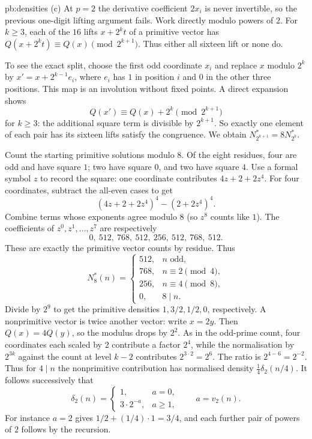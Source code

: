 \begin{solution}{pb:densities}
(c) At $p=2$ the derivative coefficient $2x_i$ is never invertible, so the previous one-digit lifting argument fails. Work directly modulo powers of $2$. For $k\ge3$, each of the $16$ lifts $x+2^kt$ of a primitive vector has
$Q(x+2^kt)\equiv Q(x)\pmod{2^{k+1}}$. Thus either all sixteen lift or none do.

To see the exact split, choose the first odd coordinate $x_i$ and replace $x$ modulo $2^k$ by $x'=x+2^{k-1}e_i$, where $e_i$ has $1$ in position $i$ and $0$ in the other three positions. This map is an involution without fixed points. A direct expansion shows
\[
Q(x')\equiv Q(x)+2^k\pmod{2^{k+1}}
\]
for $k\ge3$: the additional square term is divisible by $2^{k+1}$. So exactly one element of each pair has its sixteen lifts satisfy the congruence. We obtain
$N^*_{2^{k+1}}=8N^*_{2^k}$.

Count the starting primitive solutions modulo $8$.
Of the eight residues, four are odd and have square $1$;
two have square $0$, and two have square $4$.
Use a formal symbol $z$ to record the square: one coordinate
contributes $4z+2+2z^4$.
For four coordinates, subtract the all-even cases to get
\[
(4z+2+2z^4)^4-(2+2z^4)^4.
\]
Combine terms whose exponents agree modulo $8$ (so $z^8$
counts like $1$). The coefficients of $z^0,z^1,\ldots,z^7$
are respectively
\[
0,\ 512,\ 768,\ 512,\ 256,\ 512,\ 768,\ 512.
\]
These are exactly the primitive vector counts by residue.
Thus
\[
N_8^*(n)=
\begin{cases}
512,&n\text{ odd},\\
768,&n\equiv2\pmod4,\\
256,&n\equiv4\pmod8,\\
0,&8\mid n.
\end{cases}
\]
Divide by $2^9$ to get the primitive densities $1,3/2,1/2,0$, respectively. A nonprimitive vector is twice another vector: write $x=2y$. Then $Q(x)=4Q(y)$, so the modulus drops by $2^2$. As in the odd-prime count, four coordinates each scaled by $2$ contribute a factor $2^4$, while the normalisation by $2^{3k}$ against the count at level $k-2$ contributes $2^{3\cdot2}=2^6$. The ratio is $2^{4-6}=2^{-2}$. Thus for $4\mid n$ the nonprimitive contribution has normalised density
$\frac14\delta_2(n/4)$. It follows successively that
\[
\boxed{\delta_2(n)=
\begin{cases}
1,&a=0,\\
3\cdot2^{-a},&a\ge1,
\end{cases}\qquad a=v_2(n).}
\]
For instance $a=2$ gives $1/2+(1/4)\cdot1=3/4$, and each further pair of powers of $2$ follows by the recursion.


\end{solution}
